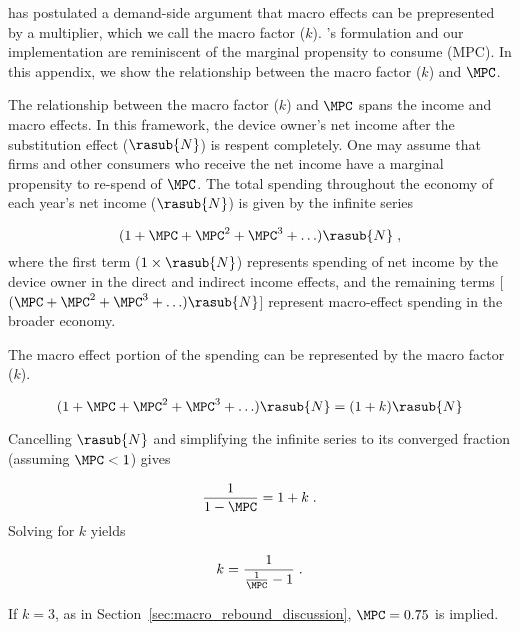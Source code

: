 
\citet{Borenstein:2015aa} has postulated a demand-side argument that macro effects 
can be prepresented by a multiplier, which we call the macro factor ($k$).
\citeauthor{Borenstein:2015aa}'s formulation and our implementation 
are reminiscent of the marginal propensity to consume (MPC).
In this appendix, we show the relationship between the macro factor ($k$) and $\MPC$.

The relationship between the macro factor ($k$) and $\MPC$ spans
the income and macro effects.
In this framework, the device owner's net income 
after the substitution effect ($\rasub{N}$) is respent completely.
One may assume that firms and other consumers who receive the net income have a 
marginal propensity to re-spend of $\MPC$.
The total spending throughout the economy of each year's net income ($\rasub{N}$)
is given by the infinite series

\begin{equation} \label{eq:infinite_series_spending}
  (1 + \MPC + \MPC^2 + \MPC^3 + \ldots) \rasub{N} \; ,
\end{equation}
%
where the first term ($1 \times \rasub{N}$) represents spending of net income by the device owner
in the direct and indirect income effects, and
the remaining terms 
[$(\MPC + \MPC^2 + \MPC^3 + \ldots) \rasub{N}$]
represent macro-effect spending in the broader economy.

The macro effect portion of the spending can be represented by the macro factor ($k$).

\begin{equation} \label{eq:mpc_and_k}
  (1 + \MPC + \MPC^2 + \MPC^3 + \ldots) \rasub{N} = (1 + k) \rasub{N}
\end{equation}

Cancelling $\rasub{N}$ and simplifying the infinite series to its converged fraction
(assuming $\MPC < 1$) gives

\begin{equation}
  \frac{1}{1 - \MPC} = 1 + k \; .
\end{equation}
%
Solving for $k$ yields

\begin{equation} \label{eq:mpc_and_k_converged}
  k = \frac{1}{\frac{1}{\MPC} - 1} \; .
\end{equation}

If $k = 3$, as in Section~\ref{sec:macro_rebound_discussion}, 
$\MPC = 0.75$ is implied.
